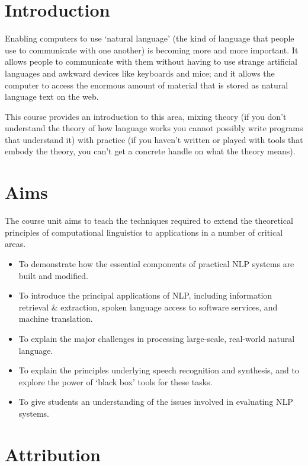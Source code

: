 \section*{Introduction}

Enabling computers to use `natural language' (the kind of language that people
use to communicate with one another) is becoming more and more important. It
allows people to communicate with them without having to use strange artificial
languages and awkward devices like keyboards and mice; and it allows the
computer to access the enormous amount of material that is stored as natural
language text on the web.

This course provides an introduction to this area, mixing theory (if you don't
understand the theory of how language works you cannot possibly write programs
that understand it) with practice (if you haven't written or played with tools
that embody the theory, you can't get a concrete handle on what the theory
means).

\section*{Aims}

The course unit aims to teach the techniques required to extend the theoretical
principles of computational linguistics to applications in a number of critical
areas.

\begin{itemize}
  \item To demonstrate how the essential components of practical NLP systems
  are built and modified.
  \item To introduce the principal applications of NLP, including information
  retrieval \& extraction, spoken language access to software services, and
  machine translation.
  \item To explain the major challenges in processing large-scale, real-world
  natural language.
  \item To explain the principles underlying speech recognition and synthesis,
  and to explore the power of `black box' tools for these tasks.
  \item To give students an understanding of the issues involved in evaluating
  NLP systems.
\end{itemize}

\section*{Attribution}

